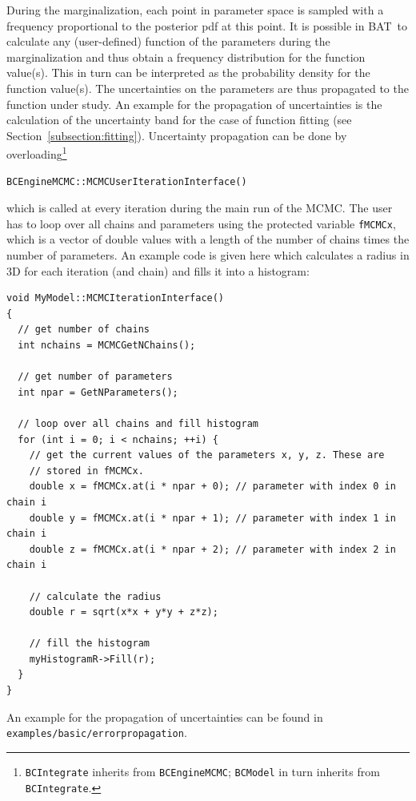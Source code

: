 \documentclass[11pt, a4paper]{article}
\newcommand{\bat}{{\sc BAT}}
\newcommand{\code}[1]{\texttt{#1}}
\begin{document}
During the marginalization, each point in parameter space is sampled
with a frequency proportional to the posterior pdf at this point. It
is possible in \bat\ to calculate any (user-defined) function of the
parameters during the marginalization and thus obtain a frequency
distribution for the function value(s). This in turn can be
interpreted as the probability density for the function value(s). The
uncertainties on the parameters are thus propagated to the function
under study. An example for the propagation of uncertainties is the
calculation of the uncertainty band for the case of function fitting
(see Section~\ref{subsection:fitting}).  Uncertainty propagation can
be done by overloading\footnote{\code{BCIntegrate} inherits from
  \code{BCEngineMCMC}; \code{BCModel} in turn inherits from
  \code{BCIntegrate}.}
%
\begin{verbatim}
BCEngineMCMC::MCMCUserIterationInterface()
\end{verbatim}
%
which is called at every iteration during the main run of the
MCMC. The user has to loop over all chains and parameters using the
protected variable \verb|fMCMCx|, which is a vector of double values
with a length of the number of chains times the number of
parameters. An example code is given here which calculates a radius in
3D for each iteration (and chain) and fills it into a histogram:

\begin{verbatim}
void MyModel::MCMCIterationInterface()
{
  // get number of chains
  int nchains = MCMCGetNChains();

  // get number of parameters
  int npar = GetNParameters();

  // loop over all chains and fill histogram
  for (int i = 0; i < nchains; ++i) {
    // get the current values of the parameters x, y, z. These are
    // stored in fMCMCx.
    double x = fMCMCx.at(i * npar + 0); // parameter with index 0 in chain i
    double y = fMCMCx.at(i * npar + 1); // parameter with index 1 in chain i
    double z = fMCMCx.at(i * npar + 2); // parameter with index 2 in chain i

    // calculate the radius
    double r = sqrt(x*x + y*y + z*z);

    // fill the histogram
    myHistogramR->Fill(r);
  }
}
\end{verbatim}

An example for the propagation of uncertainties can be found in
\linebreak \verb|examples/basic/errorpropagation|.
\end{document}
